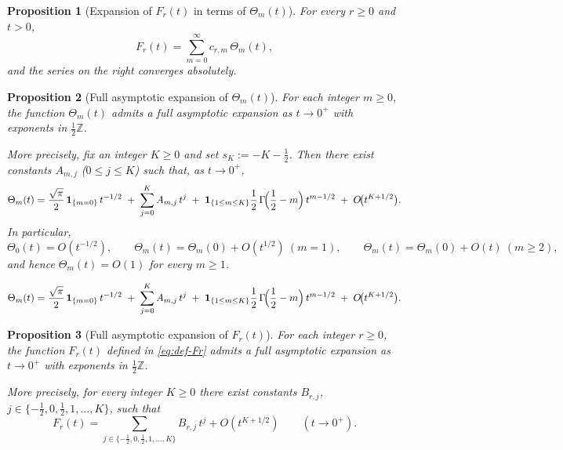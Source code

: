 \documentclass[10pt,a4paper]{amsart}
\newtheorem{proposition}{Proposition}
\newcommand{\Z}{\mathbb{Z}}
\begin{document}
\begin{proposition}[Expansion of $F_r(t)$ in terms of $\Theta_m(t)$]\label{prop:Fr-Theta}
For every $r\ge 0$ and $t>0$,
\begin{equation}\label{eq:Fr-Theta}
F_r(t)=\sum_{m=0}^\infty c_{r,m}\,\Theta_m(t),
\end{equation}
and the series on the right converges absolutely.
\end{proposition}

\begin{proposition}[Full asymptotic expansion of $\Theta_m(t)$]\label{prop:Theta-asymp}
For each integer $m\ge 0$, the function $\Theta_m(t)$ admits a full asymptotic expansion
as $t\to 0^+$ with exponents in $\tfrac12\Z$.

More precisely, fix an integer $K\ge 0$ and set $s_K:=-K-\tfrac12$. Then there exist
constants $A_{m,j}$ ($0\le j\le K$) such that, as $t\to 0^+$,
\begin{equation}\label{eq:Theta-K}
\Theta_m(t)
=\frac{\sqrt{\pi}}{2}\,\mathbf{1}_{\{m=0\}}\,t^{-1/2}
\;+\;\sum_{j=0}^{K}A_{m,j}\,t^{j}
\;+\;\mathbf{1}_{\{1\le m\le K\}}\frac12\,\Gamma\!\Bigl(\frac12-m\Bigr)\,t^{m-1/2}
\;+\;O\!\bigl(t^{K+1/2}\bigr).
\end{equation}
In particular,
\[
\Theta_0(t)=O(t^{-1/2}),\qquad
\Theta_m(t)=\Theta_m(0)+O(t^{1/2})\ (m=1),\qquad
\Theta_m(t)=\Theta_m(0)+O(t)\ (m\ge 2),
\]
and hence $\Theta_m(t)=O(1)$ for every $m\ge 1$.
\end{proposition}

\begin{equation}
\Theta_m(t)
=\frac{\sqrt{\pi}}{2}\,\mathbf{1}_{\{m=0\}}\,t^{-1/2}
\;+\;\sum_{j=0}^{K}A_{m,j}\,t^{j}
\;+\;\mathbf{1}_{\{1\le m\le K\}}\frac12\,\Gamma\!\Bigl(\frac12-m\Bigr)\,t^{m-1/2}
\;+\;O\!\bigl(t^{K+1/2}\bigr).
\end{equation}

\begin{proposition}[Full asymptotic expansion of $F_r(t)$]\label{prop:Fr-asymp}
For each integer $r\ge 0$, the function $F_r(t)$ defined in \eqref{eq:def-Fr}
admits a full asymptotic expansion as $t\to 0^+$ with exponents in $\tfrac12\Z$.

More precisely, for every integer $K\ge 0$ there exist constants $B_{r,j}$,
$j\in\{-\tfrac12,0,\tfrac12,1,\dots,K\}$, such that
\begin{equation}\label{eq:Fr-K}
F_r(t)=\sum_{j\in\{-\tfrac12,0,\tfrac12,1,\dots,K\}}B_{r,j}\,t^{j}+O(t^{K+1/2})
\qquad(t\to 0^+).
\end{equation}
\end{proposition}
\end{document}
